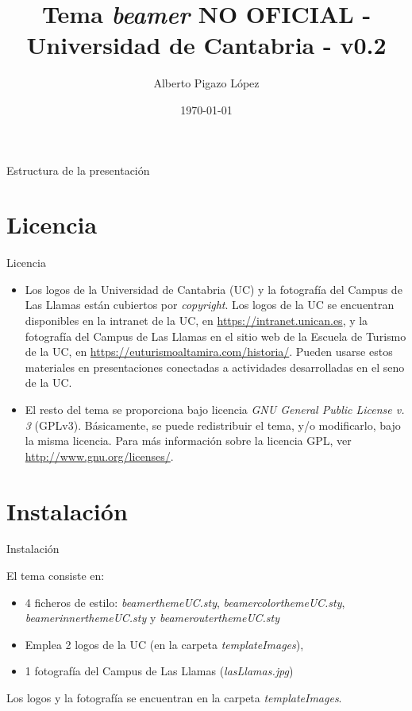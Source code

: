 \documentclass[handout,%
		aspectratio=43,%
		9pt]{beamer}
\title{Tema \emph{beamer} NO OFICIAL - Universidad de Cantabria - v0.2}
\date{\today}
\author[Autor]{Alberto Pigazo López}
\institute[Inst]{Dpto. de Ingeniería Informática y Electrónica}
\begin{document}
\begin{frame}
\titlepage
\end{frame}

\begin{frame}{Estructura de la presentación}
		\tableofcontents
\end{frame}

\section{Licencia}
\begin{frame}{Licencia}

\begin{itemize}
\item Los logos de la Universidad de Cantabria (UC) y la fotografía del Campus de Las Llamas están cubiertos por \emph{copyright}. Los logos de la UC se encuentran disponibles en la intranet de la UC, en \url{https://intranet.unican.es}, y la fotografía del Campus de Las Llamas en el sitio web de la Escuela de Turismo de la UC, en \url{https://euturismoaltamira.com/historia/}. Pueden usarse estos materiales en presentaciones conectadas a actividades desarrolladas en el seno de la UC.
\item El resto del tema se proporciona bajo licencia \emph{GNU General Public License v. 3} (GPLv3). Básicamente, se puede redistribuir el tema, y/o modificarlo, bajo la misma licencia. Para más información sobre la licencia GPL, ver \url{http://www.gnu.org/licenses/}.
\end{itemize}

\end{frame}

\section{Instalación}
\begin{frame}{Instalación}

El tema consiste en:
\begin{itemize}
\item 4 ficheros de estilo: \textit{beamerthemeUC.sty}, \textit{beamercolorthemeUC.sty}, \textit{beamerinnerthemeUC.sty} y \textit{beamerouterthemeUC.sty}
\item Emplea 2 logos de la UC (en la carpeta \textit{templateImages}),
\item 1 fotografía del Campus de Las Llamas (\textit{lasLlamas.jpg})
\end{itemize}
Los logos y la fotografía se encuentran en la carpeta \textit{templateImages}.

\end{frame}
\end{document}
